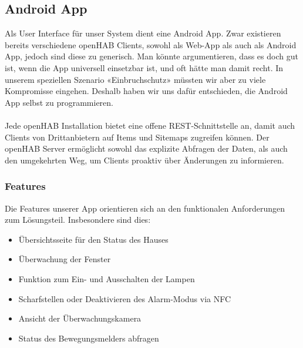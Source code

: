 \subsection{Android App}
Als User Interface für unser System dient eine Android App. Zwar existieren bereits verschiedene openHAB Clients, sowohl als Web-App als auch als Android App, jedoch sind diese zu generisch. Man könnte argumentieren, dass es doch gut ist, wenn die App universell einsetzbar ist, und oft hätte man damit recht. In unserem speziellen Szenario «Einbruchschutz» müssten wir aber zu viele Kompromisse eingehen. Deshalb haben wir uns dafür entschieden, die Android App selbst zu programmieren. 
\\ \\
Jede openHAB Installation bietet eine offene REST-Schnittstelle an, damit auch Clients von Drittanbietern auf Items und Sitemaps zugreifen können. Der openHAB Server ermöglicht sowohl das explizite Abfragen der Daten, als auch den umgekehrten Weg, um Clients proaktiv über Änderungen zu informieren. 

\subsubsection{Features}
Die Features unserer App orientieren sich an den funktionalen Anforderungen zum Lösungsteil. Insbesondere sind dies:

\begin{itemize}
	\item Übersichtsseite für den Status des Hauses
	\item Überwachung der Fenster
	\item Funktion zum Ein- und Ausschalten der Lampen
	\item Scharfstellen oder Deaktivieren des Alarm-Modus via NFC
	\item Ansicht der Überwachungskamera
	\item Status des Bewegungsmelders abfragen
\end{itemize}


